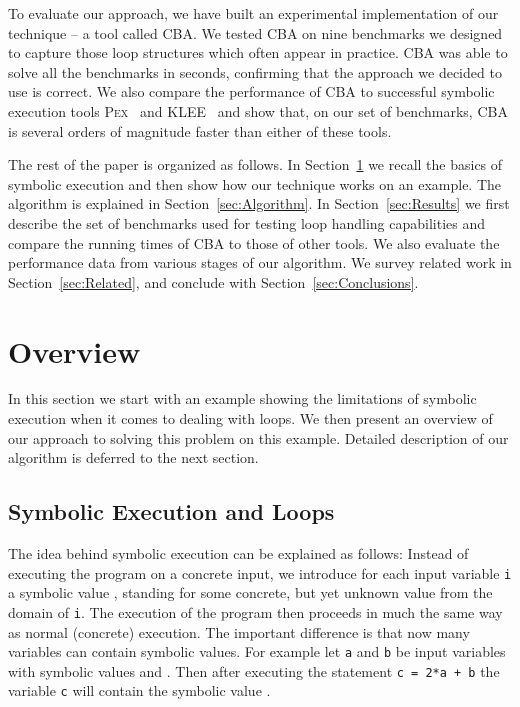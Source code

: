 \documentclass{llncs}
\newcommand{\Pex}{\textsc{Pex}\xspace}
\newcommand{\Klee}{\textsc{KLEE}\xspace}
\newcommand{\CBATool}{\textsc{CBA}\xspace}
\begin{document}
To evaluate our approach, we have built an experimental implementation of
our technique -- a tool called \CBATool.
We tested \CBATool on nine benchmarks we designed to capture those loop
structures which often appear in practice. 
\CBATool was able to solve all the benchmarks in seconds, confirming that the
approach we decided to use is correct. We also compare the performance of
\CBATool to successful symbolic execution tools
\Pex~\cite{TdH08,Pex} and \Klee~\cite{CDE08} and show that, on our set of
benchmarks, \CBATool is several orders of magnitude faster than either of
these tools.

The rest of the paper is organized as follows. In Section~\ref{sec:Overview}
we recall the basics of symbolic execution and then show how our technique
works on an example. The algorithm is explained in 
Section~\ref{sec:Algorithm}. 
In Section~\ref{sec:Results} we first describe the set of benchmarks used for testing
loop handling capabilities and compare the running times of \CBATool to
those of other tools. We also evaluate the performance data from various stages
of our algorithm. We survey related work in Section~\ref{sec:Related}, and
conclude with Section~\ref{sec:Conclusions}.


\section{Overview}
\label{sec:Overview}
In this section we start with an example showing the limitations of symbolic
execution when it comes to dealing with loops. We then present an overview
of our approach to solving this problem on this example. Detailed
description of our algorithm is deferred to the next section.


\subsection{Symbolic Execution and Loops}
\label{sec:Overview_1}

The idea behind symbolic execution can be explained as follows: Instead of
executing the program on a concrete input, we introduce for each input variable
\texttt{i} a symbolic value , standing for some
concrete, but yet unknown value from the domain of \texttt{i}. The execution
of the program then proceeds in much the same way as normal (concrete) execution. The
important difference is that now many variables can  contain symbolic
values. For example let \texttt{a} and \texttt{b} be input variables with
symbolic values  and . Then  after
executing the statement \texttt{c = 2*a + b} the variable \texttt{c} will
contain the symbolic  value .
\end{document}
